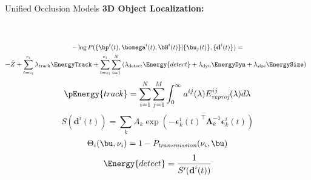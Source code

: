 \documentclass[handout,final]{beamer}
\newcommand{\Ptransmission}{P_{\textit{transmission}}}%
\newcommand{\bepsilon}{{\bm{\epsilon}}}
\newcommand{\meandepth}[1]{\nu_#1}
\newcommand{\bLambda}{\bm{\Lambda}}
\newlength{\onecolwid}
\begin{document}
\begin{frame}[t]
\begin{columns}[t]
\begin{column}{\onecolwid}
\begin{block}{Unified Occlusion Models}
	  \textbf{3D Object Localization:}
		\begin{figure}
			\newcommand{\imagewidth}{18cm}
		      \hspace{-0.8cm}
		     \\
		      \hspace{-0.8cm}
		            
        \end{figure}	
        \begin{multline*}
          -\log{P(\{ \bp^i(t) , \bomega^i(t) , \bB^i(t) \} | \{\bu_j(t)\} , \{\textbf{d}^i(t)\} )} = \\
          -\tilde{Z} 
          + \sum_{t=s_i}^{e_i} \lambda_{\text{track}}\EnergyTrack
          +  
          \sum_{t=s_i}^{e_i} \sum_{i=1}^N  
          \left(
            \lambda_{\text{detect}}\Energy{detect}
            + \lambda_{\text{dyn}}\EnergyDyn    
            + \lambda_{\text{size}}\EnergySize
          \right)
          \enspace
        \end{multline*}        
        \begin{align}
		  \pEnergy{track} = \sum_{i=1}^{N} \sum_{j = 1}^{M} \int_0^\infty a^{ij}(\lambda) E^{ij}_{\textit{reproj}}(\lambda) d\lambda
		\end{align}        
        \begin{equation}
			S(\textbf{d}^i(t)) = \sum_k A_k \exp \left( -\bepsilon_k^{i}(t)^\top \bLambda_k^{-1} \bepsilon_k^{i}(t) \right)
		\end{equation}		
		\begin{align}
		  \Theta_{i}(\bu, \meandepth{i}) = 1 - \Ptransmission(\meandepth{i}, \bu)
		\end{align}		
		\begin{align}
		  \Energy{detect} = \frac{1}{S'(\textbf{d}^i(t))}
		\end{align}
        
                


\end{block}
\end{column}
\end{columns}
\end{frame}
\end{document}
